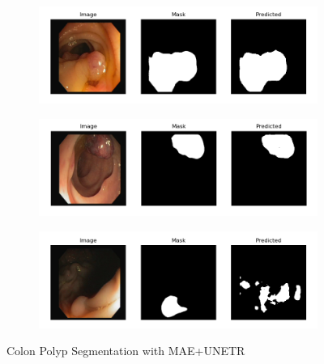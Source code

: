 \begin{figure}[]
    \centering
    \begin{subfigure}{1\textwidth}
        \centering
        \includegraphics[width=\linewidth]{images/results/CVC-mae2.png}
        \subcaption{}
        \label{fig:cvc-mae1}
    \end{subfigure}
    \vspace{1em}      
    \begin{subfigure}{1\textwidth}
        \centering
        \includegraphics[width=\linewidth]{images/results/CVC-maep.png}
        \subcaption{}
        \label{fig:cvc-mae2}
    \end{subfigure}
    \vspace{1em}      
    \begin{subfigure}{1\textwidth}
        \centering
        \includegraphics[width=\linewidth]{images/results/CVC-mae4.png}
        \subcaption{}
        \label{fig:cvc-mae3}
    \end{subfigure}
    \caption{Colon Polyp Segmentation with MAE+UNETR}
    \label{fig:cvc-mae}
\end{figure}
